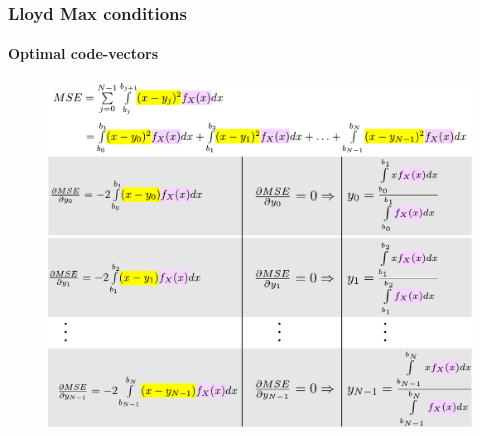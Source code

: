\begin{frame}[plain]
\frametitle{Lloyd Max conditions}
\framesubtitle{Optimal code-vectors}
\logoCSIPCPL\mypagenum
	\begin{changemargin}{-1.3in}{0in}
		\begin{figure}				
			\includegraphics[height=0.8\textheight]{thesis/Quantization_optimalCodevectors.pdf}
		\end{figure}
	\end{changemargin}
\end{frame}



%
%
%


